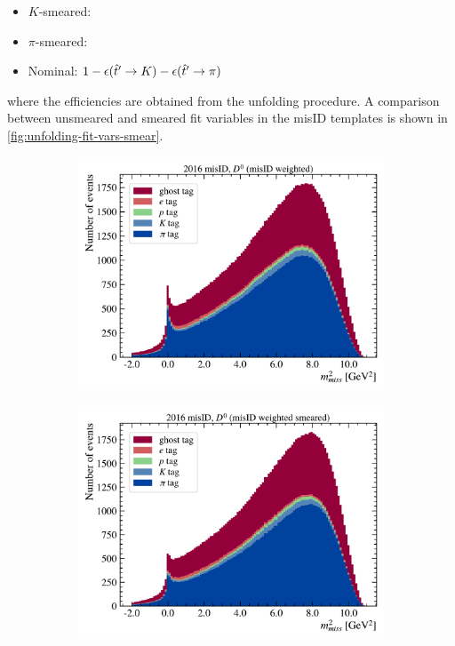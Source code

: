 \begin{itemize}
    \item $K$-smeared: 
    \item $\pi$-smeared: \misEff[\hat{t}']{\pi}
    \item Nominal: $1 - \misEff[\hat{t}']{K} - \misEff[\hat{t}']{\pi}$
\end{itemize}
where the efficiencies are obtained from the unfolding procedure.
A comparison between unsmeared and smeared fit variables in the misID templates
is shown in \cref{fig:unfolding-fit-vars-smear}.

\begin{figure}[!htb]
    \centering
    \begin{subfigure}[b]{0.32\textwidth}
        \centering
        \includegraphics[width=\textwidth]{figs-fit-fit-templates/data-driven-plots/misid/D0_mm2.pdf}
    \end{subfigure}
    \hfill
    \begin{subfigure}[b]{0.32\textwidth}
        \centering
        \includegraphics[width=\textwidth]{figs-fit-fit-templates/data-driven-plots/misid/D0_mm2_smr.pdf}

\end{subfigure}
\end{figure}
